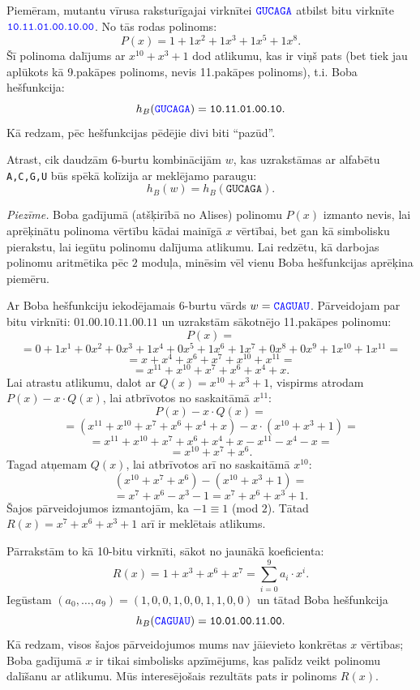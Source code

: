 \documentclass[a4paper]{article}
\begin{document}
Piemēram, mutantu vīrusa raksturīgajai virknītei
$\textcolor{blue}{\mathtt{GUCAGA}}$ atbilst bitu virknīte 
$\textcolor{blue}{\mathtt{10.11.01.00.10.00}}$. No tās rodas 
polinoms:
$$P(x) = 1 + 1x^2 + 1x^3 + 1x^5 + 1x^8.$$
Šī polinoma dalījums ar $x^{10} + x^3 + 1$ dod atlikumu, kas ir viņš pats
(bet tiek jau aplūkots kā 9.pakāpes polinoms, nevis 11.pakāpes polinoms), 
t.i. Boba hešfunkcija:
$$h_B(\textcolor{blue}{\mathtt{GUCAGA}}) = \mathtt{10.11.01.00.10}.$$
Kā redzam, pēc hešfunkcijas pēdējie divi biti ``pazūd''. 

Atrast, cik daudzām $6$-burtu kombinācijām $w$, kas uzrakstāmas ar 
alfabētu {\tt A,C,G,U} būs spēkā kolīzija ar meklējamo paraugu:
$$h_B(w) = h_B(\mathtt{GUCAGA}).$$

\vspace{5pt}
{\footnotesize
{\em Piezīme.} Boba gadījumā (atšķirībā no Alises) polinomu $P(x)$ izmanto nevis, lai aprēķinātu 
polinoma vērtību kādai mainīgā $x$ vērtībai, bet gan kā simbolisku pierakstu, 
lai iegūtu polinomu dalījuma atlikumu. Lai redzētu, kā darbojas polinomu aritmētika 
pēc $2$ moduļa, minēsim vēl vienu Boba hešfunkcijas aprēķina piemēru.

Ar Boba hešfunkciju iekodējamais $6$-burtu vārds $w = \textcolor{blue}{\mathtt{CAGUAU}}$. 
Pārveidojam par bitu virknīti: $\mathtt{01.00.10.11.00.11}$ un uzrakstām 
sākotnējo 11.pakāpes polinomu: 
$$P(x) = $$
$$=0 + 1x^1 + 0x^2 + 0x^3 + 1x^4 + 0x^5 + 1x^6 + 1x^7 + 0x^8 + 0x^9 + 1x^{10} + 1x^{11}=$$
$$ = x + x^4 + x^6 + x^7 + x^{10} + x^{11} = $$
$$ = x^{11} + x^{10} + x^7 + x^6 + x^4 + x.$$
Lai atrastu atlikumu, dalot ar $Q(x) = x^{10} + x^3 + 1$, vispirms atrodam 
$P(x) - x\cdot{}Q(x)$, lai atbrīvotos no saskaitāmā $x^{11}$:
$$P(x) - x\cdot{}Q(x) = $$
$$=\left( x^{11} + x^{10} + x^7 + x^6 + x^4 + x \right) - 
x \cdot \left( x^{10} + x^3 + 1 \right) = $$
$$=x^{11} + x^{10} + x^7 + x^6 + x^4 + x - x^{11} - x^4 - x = $$
$$=x^{10} + x^7 + x^6.$$
Tagad atņemam $Q(x)$, lai atbrīvotos arī no saskaitāmā $x^{10}$: 
$$\left( x^{10} + x^7 + x^6 \right) - \left( x^{10} + x^3 + 1 \right)=$$
$$= x^7 + x^6 - x^3 - 1 = x^7 + x^6 + x^3 + 1.$$
Šajos pārveidojumos izmantojām, ka $-1 \equiv 1$ (mod $2$). 
Tātad $R(x) = x^7 + x^6 + x^3 + 1$ arī ir meklētais atlikums. 

Pārrakstām to kā 10-bitu virknīti, sākot no jaunākā koeficienta:
$$R(x) = 1 + x^3 + x^6 + x^7 = \sum_{i=0}^{9} a_i \cdot x^i.$$
Iegūstam $(a_0,\ldots,a_{9}) = (1,0,0,1,0,0,1,1,0,0)$ un tātad
Boba hešfunkcija 
$$h_B(\textcolor{blue}{\mathtt{CAGUAU}}) = \mathtt{10.01.00.11.00}.$$
Kā redzam, visos šajos pārveidojumos mums nav jāievieto konkrētas $x$ vērtības; 
Boba gadījumā $x$ ir tikai simbolisks apzīmējums, kas palīdz 
veikt polinomu dalīšanu ar atlikumu. Mūs interesējošais rezultāts pats ir 
polinoms $R(x)$.
}
\end{document}
